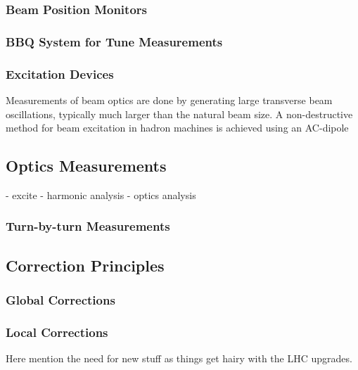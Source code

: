 \subsubsection{Beam Position Monitors}


\subsubsection{BBQ System for Tune Measurements}

\subsubsection{Excitation Devices}


Measurements of beam optics are done by generating large transverse beam oscillations, typically much larger than the natural beam size.
A non-destructive method for beam excitation in hadron machines is achieved using an AC-dipole

\subsection{Optics Measurements}

- excite
- harmonic analysis
- optics analysis

\subsubsection{Turn-by-turn Measurements}

\subsection{Correction Principles}

\subsubsection{Global Corrections}

\subsubsection{Local Corrections}

Here mention the need for new stuff as things get hairy with the LHC upgrades.